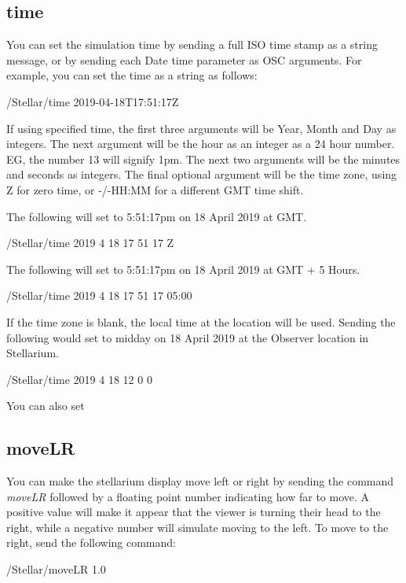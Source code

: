  \subsection{time} 
You can set the simulation time by sending a full ISO time stamp as a string message, or by sending each Date time parameter as OSC arguments. For example, you can set the time as a string as follows:

\begin{syntax}	
	\medskip
	/Stellar/time 2019-04-18T17:51:17Z
	\medskip
\end{syntax}

If using specified time, the first three arguments will be  Year, Month and  Day as integers. The next  argument will be the hour as an integer as a 24 hour number. EG, the number 13 will signify 1pm. The next two arguments will be the minutes and seconds as integers.  The final optional argument will be the time zone, using Z for zero time, or -/-HH:MM for a different GMT time shift.

The following will set to 5:51:17pm on 18 April 2019 at GMT.

\begin{syntax}	
	\medskip
	/Stellar/time 2019 4 18 17 51 17 Z
	\medskip
\end{syntax}

The following will set to 5:51:17pm on 18 April 2019 at GMT + 5 Hours.
\begin{syntax}	
	\medskip
	/Stellar/time 2019 4 18 17 51 17 05:00
	\medskip
\end{syntax}

If the time zone is blank, the local time at the location will be used. 
Sending the following would set to midday on 18 April 2019 at the Observer location in Stellarium.

\begin{syntax}	
	\medskip
	/Stellar/time 2019 4 18 12 0 0 
	\medskip
\end{syntax}

You can also set 

\subsection{moveLR} 
You can make the stellarium display move left or right by sending the command \textit{moveLR} followed by a floating point number indicating how far to move. A positive value will make it appear that the viewer is turning their head to the right, while a negative number will simulate moving to the left. To move to the right, send the following command:
  \begin{syntax}	
 	\medskip
 	/Stellar/moveLR 1.0
 	\medskip
 \end{syntax}
 \bigskip

